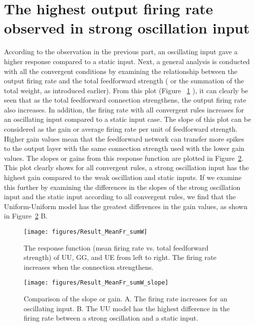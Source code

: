 \section{The highest output firing rate observed in strong oscillation input}
 According to the observation in the previous part, an oscillating input gave a higher response compared to a static input. Next, a general analysis is conducted with all the convergent conditions by examining the relationship between the output firing rate and the total feedforward strength ( or the summation of the total weight, as introduced earlier). From this plot (Figure ~\ref{fig:ResFun} ), it can clearly be seen that as the total feedforward connection strengthens, the output firing rate also increases.
 In addition, the firing rate with all convergent rules increases for an oscillating input compared to a static input case. The slope of this plot can be considered as the gain or average firing rate per unit of feedforward strength. Higher gain values mean that the feedforward network can transfer more spikes to the output layer with the same connection strength used with the lower gain values. The slopes or gains from this response function are plotted in Figure~\ref{fig:ResFunDiff}. This plot clearly shows for all convergent rules, a strong oscillation input has the highest gain compared to the weak oscillation and static inputs. If we examine this further by examining the differences in the slopes of the strong oscillation input and the static input according to all convergent rules, we find that the Uniform-Uniform model has the greatest differences in the gain values, as shown in Figure~\ref{fig:ResFunDiff} B. 


\begin{figure}[!h]
	\centering
	\texttt{[image: figures/Result\_MeanFr\_sumW]}
	\caption{The response function (mean firing rate vs. total feedforward strength) of UU, GG, and UE from left to right. The firing rate increases when the connection strengthens.}
	\label{fig:ResFun}
\end{figure}


\begin{figure}[!h]
	\centering
	\texttt{[image: figures/Result\_MeanFr\_sumW\_slope]}
	\caption{Comparison of the slope or gain. A. The firing rate increases for an oscillating input. B. The UU model has the highest difference in the firing rate between a strong oscillation and a static input.}
	\label{fig:ResFunDiff}
\end{figure}


